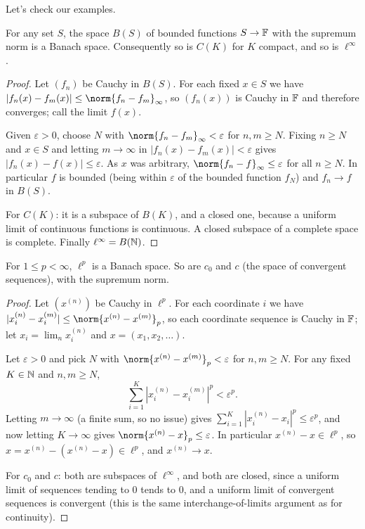 \documentclass[a4paper]{scrartcl}
\begin{document}
Let's check our examples.

\begin{proposition}
	For any set $S$, the space $B(S)$ of bounded functions $S \to \mathbb{F}$ with the supremum norm is a Banach space. Consequently so is $C(K)$ for $K$ compact, and so is $\ell^\infty$.
\end{proposition}

\begin{proof}
	Let $(f_n)$ be Cauchy in $B(S)$. For each fixed $x \in S$ we have $|f_n(x) - f_m(x)| \leq \norm{f_n - f_m}_\infty$, so $(f_n(x))$ is Cauchy in $\mathbb{F}$ and therefore converges; call the limit $f(x)$.

	Given $\varepsilon > 0$, choose $N$ with $\norm{f_n - f_m}_\infty < \varepsilon$ for $n, m \geq N$. Fixing $n \geq N$ and $x \in S$ and letting $m \to \infty$ in $|f_n(x) - f_m(x)| < \varepsilon$ gives $|f_n(x) - f(x)| \leq \varepsilon$. As $x$ was arbitrary, $\norm{f_n - f}_\infty \leq \varepsilon$ for all $n \geq N$. In particular $f$ is bounded (being within $\varepsilon$ of the bounded function $f_N$) and $f_n \to f$ in $B(S)$.

	For $C(K)$: it is a subspace of $B(K)$, and a closed one, because a uniform limit of continuous functions is continuous. A closed subspace of a complete space is complete. Finally $\ell^\infty = B(\mathbb{N})$.
\end{proof}

\begin{proposition}
	For $1 \leq p < \infty$, $\ell^p$ is a Banach space. So are $c_0$ and $c$ (the space of convergent sequences), with the supremum norm.
\end{proposition}

\begin{proof}
	Let $(x^{(n)})$ be Cauchy in $\ell^p$. For each coordinate $i$ we have $|x_i^{(n)} - x_i^{(m)}| \leq \norm{x^{(n)} - x^{(m)}}_p$, so each coordinate sequence is Cauchy in $\mathbb{F}$; let $x_i = \lim_n x_i^{(n)}$ and $x = (x_1, x_2, \dots)$.

	Let $\varepsilon > 0$ and pick $N$ with $\norm{x^{(n)} - x^{(m)}}_p < \varepsilon$ for $n, m \geq N$. For any fixed $K \in \mathbb{N}$ and $n, m \geq N$,
	$$\sum_{i=1}^K |x_i^{(n)} - x_i^{(m)}|^p < \varepsilon^p.$$
	Letting $m \to \infty$ (a finite sum, so no issue) gives $\sum_{i=1}^K |x_i^{(n)} - x_i|^p \leq \varepsilon^p$, and now letting $K \to \infty$ gives $\norm{x^{(n)} - x}_p \leq \varepsilon$. In particular $x^{(n)} - x \in \ell^p$, so $x = x^{(n)} - (x^{(n)} - x) \in \ell^p$, and $x^{(n)} \to x$.

	For $c_0$ and $c$: both are subspaces of $\ell^\infty$, and both are closed, since a uniform limit of sequences tending to $0$ tends to $0$, and a uniform limit of convergent sequences is convergent (this is the same interchange-of-limits argument as for continuity).
\end{proof}
\end{document}
